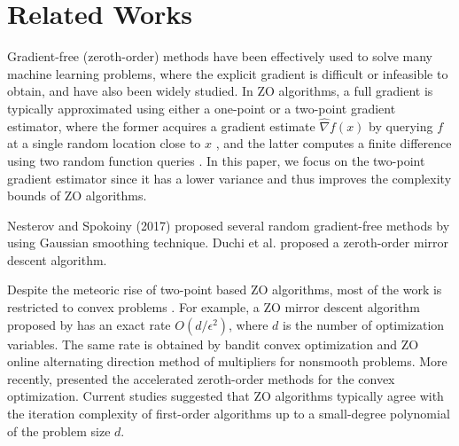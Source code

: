 \documentclass{article}
\theoremstyle{definition}
\theoremstyle{remark}
\begin{document}
\section{Related Works}
{\color{Green}
Gradient-free (zeroth-order) methods have been effectively used to solve many machine learning problems, where the explicit gradient is difficult or infeasible to obtain, and have also been widely studied. 
{\color{Brown}
In ZO algorithms, a full gradient is typically approximated using either a one-point or a two-point gradient estimator, where the former acquires a gradient estimate $\hat{\nabla} f(x)$ by querying $f$ at a single random location close to $x$ \cite{flaxman2005online,shamir2013complexity}, and the latter computes a finite difference using two random function queries \cite{agarwal2010optimal,nesterov2017random}. In this paper, we focus on the two-point gradient estimator since it has a lower variance and thus improves the complexity bounds of ZO algorithms.
}

Nesterov and Spokoiny (2017) \cite{nesterov2017random} proposed several random gradient-free
methods by using Gaussian smoothing technique. Duchi et al. \cite{duchi2015optimal} proposed a zeroth-order mirror descent algorithm. 

{\color{Brown}


Despite the meteoric rise of two-point based ZO algorithms, most of the work is restricted to convex problems \cite{liu2017zeroth,duchi2015optimal,shamir2017optimal,dvurechensky2018accelerated,wang2017stochastic}. For example, a ZO mirror descent algorithm proposed by \cite{duchi2015optimal} has an exact rate $O({d}/ \epsilon^2)$, where $d$ is the number of optimization variables. The same rate is obtained by bandit convex optimization \cite{shamir2017optimal} and ZO online alternating direction method of multipliers \cite{liu2017zeroth} for nonsmooth problems. More recently, \cite{yu2018generic,dvurechensky2018accelerated} presented the accelerated zeroth-order methods for the convex optimization. Current studies suggested that ZO algorithms typically agree with the iteration complexity of first-order
algorithms up to a small-degree polynomial of the problem size $d$.

}}
\end{document}
